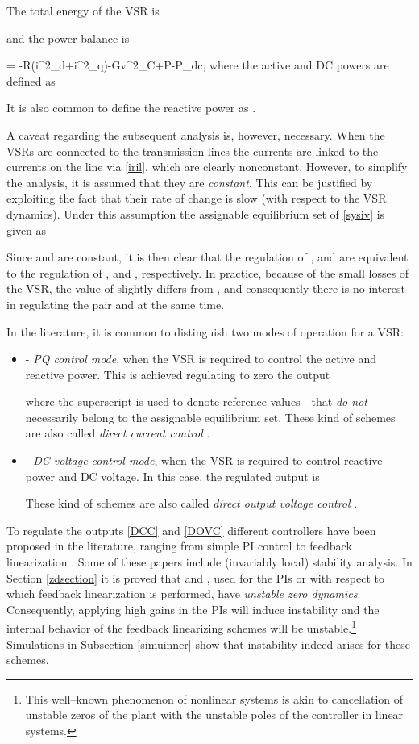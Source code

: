 \documentclass[5p,twocolumn]{elsarticle}
\def\begequ{}
\def\lab{\label}
\def\begite{\begin{itemize}}
\def\endite{\end{itemize}}
\numberwithin{equation}{section}
\begin{document}
The total energy of the VSR is

and the power balance is
\begequ
\lab{powbalvsr}
 = -R(i^2_d+i^2_q)-Gv^2_C+P-P_{dc},
\endequ
where the active and DC powers are defined as

It is also common to define the reactive power as .

A caveat regarding the subsequent analysis is, however, necessary. When the VSRs are connected to the transmission lines the currents  are linked to the currents on the line via \eqref{iril}, which are clearly nonconstant. However, to simplify the analysis, it is assumed that they are {\em constant}. This can be justified by exploiting the fact that their rate of change is slow (with respect to the VSR dynamics).
Under this assumption the assignable equilibrium set of \eqref{sysiv} is given as



Since  and  are constant, it is then clear that the regulation of ,  and  are equivalent to the regulation of ,  and , respectively. In practice, because of the small
losses of the VSR, the value of  slightly differs from , and consequently there is no interest in regulating the pair  and  at the same time.

In the literature, it is common to distinguish two modes of operation for a VSR:
\begite
\item[-] \textit{PQ control mode}, when the VSR is required to control the active and reactive power. This is achieved regulating to zero the output

where the superscript  is used to denote reference values---that {\em do not} necessarily  belong to the assignable equilibrium set. These kind of schemes are also called \textit{direct
current control} \cite{shuai}.

\item[-] \textit{DC voltage control mode}, when the VSR is required to control reactive power and DC voltage. In this case, the regulated output is

These kind of schemes are also called \textit{direct
output voltage control} \cite{shuai}.
\endite


To regulate the outputs \eqref{DCC} and \eqref{DOVC} different controllers have been proposed in the literature, ranging from simple PI control \cite{lee,pinto} to feedback linearization
\cite{chen1,chen2,bencha}. Some of these papers include (invariably local) stability analysis. In Section \ref{zdsection} it is proved that   and , used for the PIs or with respect to
which feedback linearization is performed, have {\em unstable zero dynamics}. Consequently, applying high gains in the PIs will induce instability and the internal behavior of the feedback linearizing schemes
will be unstable.\footnote{This well--known phenomenon of nonlinear systems \cite{isidori} is akin to cancellation of unstable zeros of the plant with the unstable poles of the controller in linear
systems.} Simulations in Subsection \ref{simuinner} show that instability indeed arises for these schemes.
\end{document}
